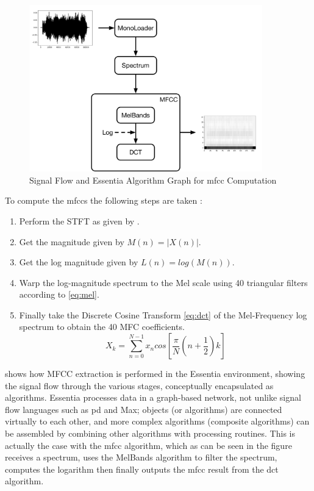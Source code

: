 {{\begin{figure}
	\begin{center}
		\includegraphics[width=0.9\textwidth]{ch05_pyconcat/figures/mfcc_diagram.pdf}
	\end{center}
	\caption[Signal Flow and Essentia Algorithm Graph for MFCC Computation ]{Signal Flow and Essentia Algorithm Graph for \acrshort{mfcc} Computation }
	\label{fig:mfcc_diagram}
\end{figure}	

To compute the \acrshort{mfcc}s the following steps are taken \citep{Logan2000, Lyons2015}:

\begin{enumerate}
  \item Perform the STFT as given by .
  \item Get the magnitude given by $M(n) = |X(n)|$.
  \item Get the log magnitude given by $L(n) = log(M(n))$.
  \item Warp the log-magnitude spectrum to the Mel scale using 40 triangular filters according to \eqref{eq:mel}.
  \item Finally take the Discrete Cosine Transform \eqref{eq:dct} of the Mel-Frequency log spectrum to obtain the 40 MFC coefficients.
  \begin{equation}
	\label{eq:dct}	
	X_k=\sum_{n=0}^{N-1}x_n cos [\frac{\pi}{N}(n+\frac{1}{2})k]
	\end{equation}
\end{enumerate}

 shows how MFCC extraction is performed in the Essentia environment, showing the signal flow through the various stages, conceptually encapsulated as algorithms. Essentia processes data in a graph-based network, not unlike signal flow languages such as \acrshort{pd} and Max; objects (or algorithms) are connected virtually to each other, and more complex algorithms (composite algorithms) can be assembled by combining other algorithms with processing routines. This is actually the case with the \acrshort{mfcc} algorithm, which as can be seen in the figure receives a spectrum, uses the MelBands algorithm to filter the spectrum, computes the logarithm then finally outputs the \acrshort{mfcc} result from the \acrshort{dct} algorithm. 

}}
